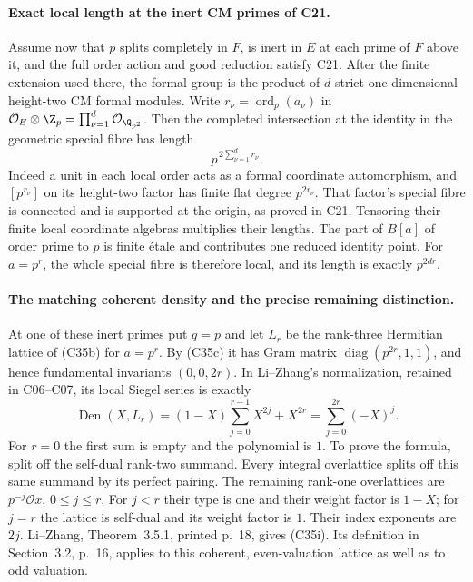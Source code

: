 \paragraph{Exact local length at the inert CM primes of C21.}
Assume now that $p$ splits completely in $F$, is inert in
$E$ at each prime of $F$ above it, and the full order action
and good reduction satisfy C21. After the finite extension
used there, the formal group is the product of $d$ strict
one-dimensional height-two CM formal modules. Write
$r_\nu=\operatorname{ord}_p(a_\nu)$ in
$\mathcal O_E\otimes\Z_p=\prod_{\nu=1}^d
\mathcal O_{\Q_{p^2}}$.
Then the completed intersection at the identity in the
geometric special fibre has length
\[
                 p^{\,2\sum_{\nu=1}^d r_\nu}.
 \tag{C35h}
\]
Indeed a unit in each local order acts as a formal
coordinate automorphism, and $[p^{r_\nu}]$ on its
height-two factor has finite flat degree $p^{2r_\nu}$.
That factor's special fibre is connected and is supported
at the origin, as proved in C21. Tensoring their finite
local coordinate algebras multiplies their lengths.
The part of $B[a]$ of order prime to $p$ is finite
\'etale and contributes one reduced identity point.
For $a=p^r$, the whole special fibre is therefore local,
and its length is exactly $p^{2dr}$.

\paragraph{The matching coherent density and the precise remaining distinction.}
At one of these inert primes put $q=p$ and let $L_r$ be
the rank-three Hermitian lattice of (C35b) for $a=p^r$.
By (C35c) it has Gram matrix
$\operatorname{diag}(p^{2r},1,1)$, and hence
fundamental invariants $(0,0,2r)$. In Li--Zhang's
normalization, retained in C06--C07, its local Siegel
series is exactly
\[
 \operatorname{Den}(X,L_r)
   =(1-X)\sum_{j=0}^{r-1}X^{2j}+X^{2r}
   =\sum_{j=0}^{2r}(-X)^j.
 \tag{C35i}
\]
For $r=0$ the first sum is empty and the polynomial is $1$.
To prove the formula, split off the self-dual rank-two
summand. Every integral overlattice splits off this same
summand by its perfect pairing. The remaining rank-one
overlattices are $p^{-j}\mathcal O x$, $0\le j\le r$.
For $j<r$ their type is one and their weight factor is
$1-X$; for $j=r$ the lattice is self-dual and its weight
factor is $1$. Their index exponents are $2j$.
Li--Zhang, Theorem~3.5.1, printed p.~18, gives (C35i).
Its definition in Section~3.2, p.~16, applies to this
coherent, even-valuation lattice as well as to odd valuation.


